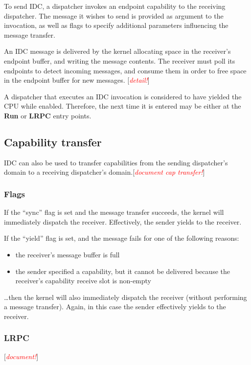 \documentclass[a4paper,11pt,twoside]{report}
\newcommand{\todo}[1]{[\textcolor{red}{\emph{#1}}]}
\begin{document}
To send IDC, a dispatcher invokes an endpoint capability to the
receiving dispatcher. The message it wishes to send is provided as
argument to the invocation, as well as flags to specify additional
parameters influencing the message transfer.

An IDC message is delivered by the kernel allocating space in the receiver's
endpoint buffer, and writing the message contents. The receiver must poll its
endpoints to detect incoming messages, and consume them in order to free space
in the endpoint buffer for new messages. \todo{detail!}

A dispatcher that executes an IDC invocation is considered to have
yielded the CPU while enabled. Therefore, the next time it is
entered may be either at the \textbf{Run} or \textbf{LRPC} entry
points.

\subsection{Capability transfer}

IDC can also be used to transfer capabilities from the sending dispatcher's
domain to a receiving dispatcher's domain.\todo{document cap transfer!}

\subsubsection{Flags}

If the ``sync'' flag is set and the message transfer succeeds, the kernel
will immediately dispatch the receiver. Effectively, the sender yields to the
receiver.

If the ``yield'' flag is set, and the message fails for one of the following reasons:
\begin{itemize}
\item the receiver's message buffer is full
\item the sender specified a capability, but it cannot be delivered because the
 receiver's capability receive slot is non-empty
\end{itemize}
\ldots then the kernel will also immediately dispatch the receiver (without
performing a message transfer). Again, in this case the sender effectively yields
to the receiver.

\subsubsection{LRPC}

\todo{document!}
\end{document}
